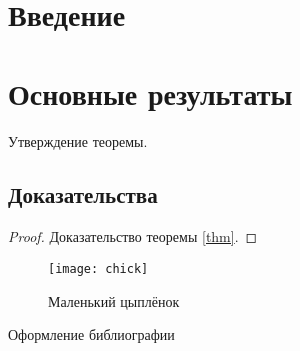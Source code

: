 \section{Введение} %


\section{Основные результаты} %


\begin{theorem} %
\label{thm}
Утверждение теоремы.
\end{theorem}

\subsection{Доказательства} %

\begin{proof} %
Доказательство теоремы \ref{thm}.
\end{proof}


\begin{corollary} %
\end{corollary}


\begin{remark} %
\end{remark}


\begin{figure}[h] %
\texttt{[image: chick]}
\caption{Маленький цыплёнок}
\end{figure}

Оформление библиографии